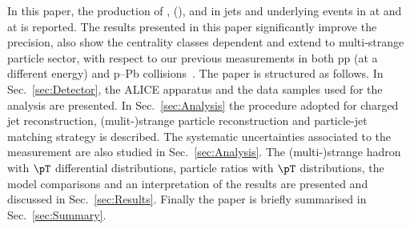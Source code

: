 In this paper, the production of \kzero, \lmb (\almb), \Xis and \Oms in jets and underlying events in \pp at \thirteen and \pPb at \fivenn is reported.
The results presented in this paper significantly improve the precision, also show the centrality classes dependent and extend to multi-strange particle sector, with respect to our previous measurements in both pp (at a different energy) and p–Pb collisions~\cite{V0injet}. 
The paper is structured as follows.
In Sec.~\ref{sec:Detector}, the ALICE apparatus and the data samples used for the analysis are presented. In Sec.~\ref{sec:Analysis} the procedure adopted for charged jet reconstruction, (mulit-)strange particle reconstruction and particle-jet matching strategy is described. 
The systematic uncertainties associated to the measurement are also studied in Sec.~\ref{sec:Analysis}.
The (multi-)strange hadron with $\pT$ differential distributions, particle ratios with $\pT$ distributions, the model comparisons and an interpretation of the results are presented and discussed in Sec.~\ref{sec:Results}.  Finally the paper is briefly summarised in Sec.~\ref{sec:Summary}.
